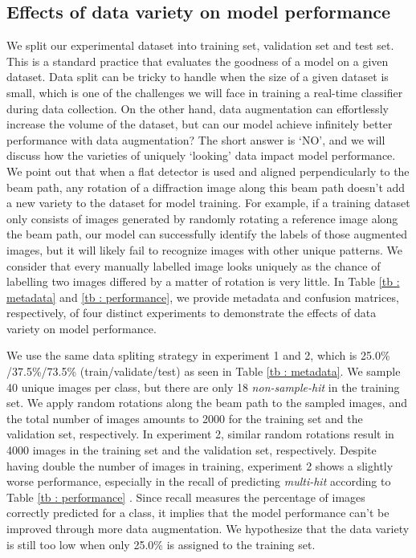 \subsection{Effects of data variety on model performance}

We split our experimental dataset into training set, validation set and test
set.  This is a standard practice that evaluates the goodness of a model on a
given dataset.  Data split can be tricky to handle when the size of a given
dataset is small, which is one of the challenges we will face in training a
real-time classifier during data collection.  On the other hand, data
augmentation can effortlessly increase the volume of the dataset, but can our
model achieve infinitely better performance with data augmentation?  The short
answer is `NO', and we will discuss how the varieties of uniquely `looking' data
impact model performance.  We point out that when a flat detector is used and
aligned perpendicularly to the beam path, any rotation of a diffraction image
along this beam path doesn't add a new variety to the dataset for model
training.  For example, if a training dataset only consists of images generated
by randomly rotating a reference image along the beam path, our model can
successfully identify the labels of those augmented images, but it will likely
fail to recognize images with other unique patterns.  We consider that every
manually labelled image looks uniquely as the chance of labelling two images
differed by a matter of rotation is very little.  In Table \ref{tb : metadata}
and \ref{tb : performance}, we provide metadata and confusion matrices,
respectively, of four distinct experiments to demonstrate the effects of data
variety on model performance.  

We use the same data spliting strategy in experiment 1 and 2, which is 25.0\%
/37.5\%/73.5\% (train/validate/test) as seen in Table \ref{tb : metadata}.  We
sample 40 unique images per class, but there are only 18 \textit{non-sample-hit}
in the training set.  We apply random rotations along the beam path to the
sampled images, and the total number of images amounts to 2000 for the training
set and the validation set, respectively.  In experiment 2, similar random
rotations result in 4000 images in the training set and the validation set,
respectively.  Despite having double the number of images in training,
experiment 2 shows a slightly worse performance, especially in the recall of
predicting \textit{multi-hit} according to Table \ref{tb : performance} .  Since
recall measures the percentage of images correctly predicted for a class, it
implies that the model performance can't be improved through more data
augmentation.  We hypothesize that the data variety is still too low when only
25.0\% is assigned to the training set.  

